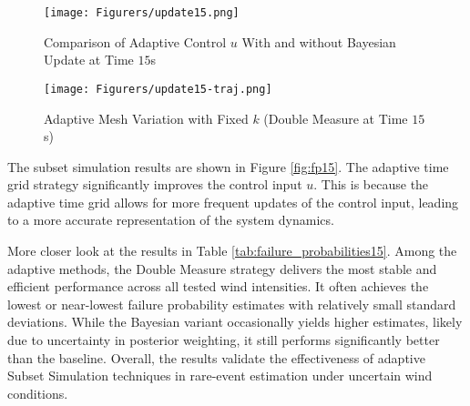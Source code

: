\begin{figure}
    \centering
    \texttt{[image: Figurers/update15.png]}
    \caption{Comparison of Adaptive Control $u$ With and without Bayesian Update at Time $15$s}
    \label{fig:meas15}
\end{figure}

\begin{figure}
    \centering
    \texttt{[image: Figurers/update15-traj.png]}
    \caption{Adaptive Mesh Variation with Fixed $k$ (Double Measure at Time $15$s)}
    \label{fig:meas15-traj}
\end{figure}

The subset simulation results are shown in Figure \ref{fig:fp15}. The adaptive time grid strategy significantly improves the control input $u$. This is because the adaptive time grid allows for more frequent updates of the control input, leading to a more accurate representation of the system dynamics.

More closer look at the results in Table \ref{tab:failure_probabilities15}. Among the adaptive methods, the Double Measure strategy delivers the most stable and efficient performance across all tested wind intensities. It often achieves the lowest or near-lowest failure probability estimates with relatively small standard deviations. While the Bayesian variant occasionally yields higher estimates, likely due to uncertainty in posterior weighting, it still performs significantly better than the baseline. Overall, the results validate the effectiveness of adaptive Subset Simulation techniques in rare-event estimation under uncertain wind conditions.

